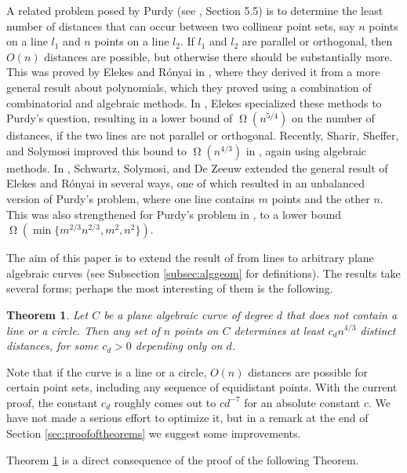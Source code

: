 \documentclass[12pt]{article}
\newtheorem{theorem}{Theorem}[section]
\begin{document}
A related problem posed by Purdy (see \cite{brass:problems}, Section 5.5) is to determine
the least number of distances that can occur between two collinear point sets,
say $n$ points on a line $l_1$ and $n$ points on a line $l_2$.
If $l_1$ and $l_2$ are parallel or orthogonal, 
then $O(n)$ distances are possible, 
but otherwise there should be substantially more.
This was proved by Elekes and R\'onyai in \cite{elekes:polynomials}, 
where they derived it from a more general result about polynomials,
which they proved using a combination of combinatorial and algebraic methods.
In \cite{elekes:note}, Elekes specialized these methods to Purdy's question,
resulting in a lower bound of $\upOmega(n^{5/4})$ on the number of distances, 
if the two lines are not parallel or orthogonal.
Recently, Sharir, Sheffer, and Solymosi improved this bound to $\upOmega(n^{4/3})$ in \cite{sharir:distances},
again using algebraic methods. 
In \cite{schwartz:extensions}, Schwartz, Solymosi, and De Zeeuw extended the general result of Elekes
and R\'onyai in several ways, one of which resulted in an unbalanced version
of Purdy's problem, where one line contains $m$ points and the other $n$.
This was also strengthened for Purdy's problem in \cite{sharir:distances}, 
to a lower bound $\upOmega(\min\{m^{2/3}n^{2/3}, m^2, n^2\})$.

The aim of this paper is to extend the result of \cite{sharir:distances}
from lines to arbitrary plane algebraic curves (see Subsection \ref{subsec:alggeom} for definitions).
The results take several forms; perhaps the most interesting of them is the following.

\begin{theorem}\label{thm:onecurve}
 Let $C$ be a plane algebraic curve of degree $d$ that does not contain a line or a circle.
 Then any set of $n$ points on $C$ determines at least $c_d n^{4/3}$ distinct distances,
 for some $c_d>0$ depending only on $d$. 
\end{theorem}
 
Note that if the curve is a line or a circle, 
$O(n)$ distances are possible for certain point sets,
including any sequence of equidistant points.
With the current proof, the constant $c_d$ roughly comes out to $cd^{-7}$ for an absolute constant $c$.
We have not made a serious effort to optimize it, 
but in a remark at the end of Section \ref{sec:proofoftheorems} we suggest some improvements.
 
Theorem \ref{thm:onecurve} is a direct consequence of the proof of the following Theorem.
  
\end{document}
